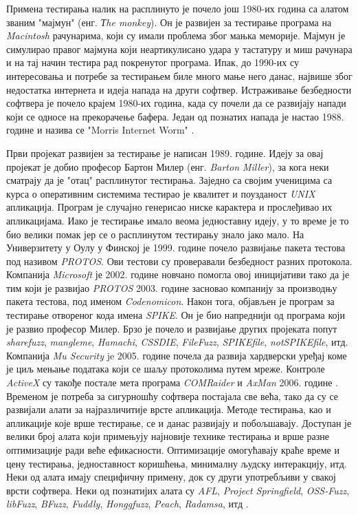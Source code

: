 \documentclass[12pt,oneside]{memoir}
\begin{document}
Примена тестирања налик на расплинуто је почело још 1980-их година са алатом званим "мајмун" (енг. \textit{Тhe monkey}). Он је развијен за тестирање програма на \textit{Macintosh} рачунарима, који су имали проблема због мањка меморије. Мајмун је симулирао правог мајмуна који неартикулисано удара у тастатуру и миш рачунара и на тај начин тестира рад покренутог програма. Ипак, до 1990-их су интересовања и потребе за тестирањем биле много мање него данас, највише због недостатка интернета и идеја напада на други софтвер. Истраживање безбедности софтвера је почело крајем 1980-их година, када су почели да се развијају напади који се односе на прекорачење бафера. Један од познатих напада је настао 1988. године и назива се "Morris Internet Worm" \cite{fuzzingBrute, fuzzing}. 

Први пројекат развијен за тестирање је написан 1989. године. Идеју за овај пројекат је добио професор Бартон Милер (енг. \textit{Barton Miller}), за кога неки сматрају да је "отац" расплинутог тестирања. Заједно са својим ученицима са курса о оперативним системима тестирао је квалитет и поузданост \textit{UNIX} апликација. Програм је случајно генерисао ниске карактера и прослеђивао их апликацијама. Иако је тестирање имало веома једноставну идеју, у то време је то био велики помак јер се о расплинутом тестирању знало јако мало. На Универзитету у Оулу у Финској је 1999. године почело развијање пакета тестова под називом \textit{PROTOS}. Ови тестови су проверавали безбедност разних протокола. Компанија \textit{Microsoft} је 2002. године новчано помогла овој иницијативи тако да је тим који је развијао \textit{PROTOS} 2003. године засновао компанију за производњу пакета тестова, под именом \textit{Codenomicon}. Након тога, објављен је програм за тестирање отвореног кода имена \textit{SPIKE}. Он је био напреднији од програма који је развио професор Милер. Брзо је почело и развијање других пројеката попут \textit{sharefuzz}, \textit{mangleme}, \textit{Hamachi}, \textit{CSSDIE}, \textit{FileFuzz}, \textit{SPIKEfile}, \textit{notSPIKEfile}, итд. Компанија \textit{Mu Security} je 2005. године почела да развија хардверски уређај коме је циљ мењање података који се шаљу протоколима путем мреже. Контроле \textit{ActiveX} су такође постале мета програма \textit{COMRaider} и \textit{AxMan} 2006. године \cite{fuzzingBrute, fuzzing}. Временом је потреба за сигурношћу софтвера постајала све већа, тако да су се развијали алати за најразличитије врсте апликација. Методе тестирања, као и апликације које врше тестирање, се и данас развијају и побољшавају. Доступан је велики број алата који примењују најновије технике тестирања и врше разне оптимизације ради веће ефикасности. Оптимизације омогућавају краће време и цену тестирања, једноставност коришћења, минималну људску интеракцију, итд. Неки од алата имају специфичну примену, док су други употребљиви у свакој врсти софтвера. Неки од познатијих алата су \textit{AFL}, \textit{Project Springfield}, \textit{OSS-Fuzz}, \textit{libFuzz}, \textit{BFuzz}, \textit{Fuddly}, \textit{Honggfuzz}, \textit{Peach}, \textit{Radamsa}, итд \cite{bestFuzzers, fuzzingBrute, fuzzing}. 
\end{document}
